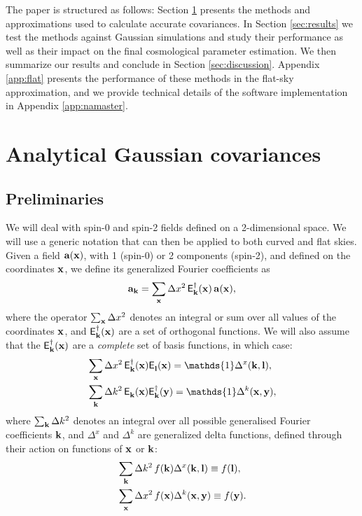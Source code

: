 \documentclass[a4paper,11pt]{article}
\newcommand{\summ}[1]{\sum_{\bf #1}\Delta #1^2}
\newcommand{\Ylm}[3]{{\sf E}^{#1}_{\bf #2}({\bf #3})}
\begin{document}
    The paper is structured as follows: Section \ref{sec:theory} presents the methods and approximations used to calculate accurate covariances. In Section \ref{sec:results} we test the methods against Gaussian simulations and study their performance as well as their impact on the final cosmological parameter estimation. We then summarize our results and conclude in Section \ref{sec:discussion}. Appendix \ref{app:flat} presents the performance of these methods in the flat-sky approximation, and we provide technical details of the software implementation in Appendix \ref{app:namaster}.

  \section{Analytical Gaussian covariances}\label{sec:theory}
    \subsection{Preliminaries}\label{ssec:theory.prelim}
      We will deal with spin-0 and spin-2 fields defined on a 2-dimensional space. We will use a generic notation that can then be applied to both curved and flat skies. Given a field ${\bf a}({\bf x})$, with 1 (spin-0) or 2 components (spin-2), and defined on the coordinates ${\bf x}$, we define its generalized Fourier coefficients as
      \begin{equation}
        {\bf a}_{\bf k}=\summ{x}\,\Ylm{\dag}{k}{x}\,{\bf a}({\bf x}),
      \end{equation}
      where the operator $\summ{x}$ denotes an integral or sum over all values of the coordinates ${\bf x}$, and $\Ylm{\dag}{k}{x}$ are a set of orthogonal functions. We will also assume that the $\Ylm{\dag}{k}{x}$ are a \emph{complete} set of basis functions, in which case:
      \begin{align}
        &\summ{x}\,\Ylm{\dag}{k}{x}\Ylm{}{l}{x}=\mathds{1}\Delta^x({\bf k},{\bf l}),\\
        &\summ{k}\,\Ylm{}{k}{x}\Ylm{\dag}{k}{y}=\mathds{1}\Delta^k({\bf x},{\bf y}),
      \end{align}
      where $\summ{k}$ denotes an integral over all possible generalised Fourier coefficients ${\bf k}$, and $\Delta^x$ and $\Delta^k$ are generalized delta functions, defined through their action on functions of ${\bf x}$ or ${\bf k}$:
      \begin{align}
        &\summ{k}\,f({\bf k})\Delta^x({\bf k},{\bf l})\equiv f({\bf l}),\\
        &\summ{x}\,f({\bf x})\Delta^k({\bf x},{\bf y})\equiv f({\bf y}).
      \end{align}
\end{document}
